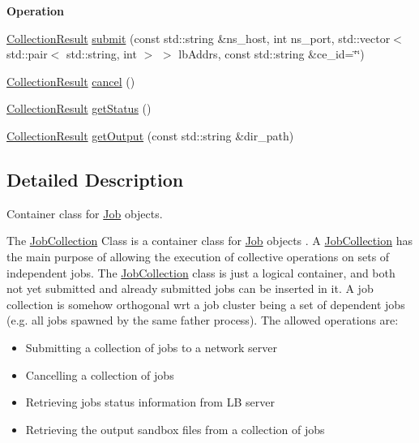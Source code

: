 \begin{Indent}{\bf Operation}\par
\begin{CompactItemize}
\item 
\hyperlink{structglite_1_1wmsui_1_1api_1_1CollectionResult}{Collection\-Result} \hyperlink{classglite_1_1wmsui_1_1api_1_1JobCollection_z7_0}{submit} (const std::string \&ns\_\-host, int ns\_\-port, std::vector$<$ std::pair$<$ std::string, int $>$ $>$ lb\-Addrs, const std::string \&ce\_\-id=\char`\"{}\char`\"{})
\item 
\hyperlink{structglite_1_1wmsui_1_1api_1_1CollectionResult}{Collection\-Result} \hyperlink{classglite_1_1wmsui_1_1api_1_1JobCollection_z7_1}{cancel} ()
\item 
\hyperlink{structglite_1_1wmsui_1_1api_1_1CollectionResult}{Collection\-Result} \hyperlink{classglite_1_1wmsui_1_1api_1_1JobCollection_z7_2}{get\-Status} ()
\item 
\hyperlink{structglite_1_1wmsui_1_1api_1_1CollectionResult}{Collection\-Result} \hyperlink{classglite_1_1wmsui_1_1api_1_1JobCollection_z7_3}{get\-Output} (const std::string \&dir\_\-path)
\end{CompactItemize}
\end{Indent}


\subsection{Detailed Description}
Container class for \hyperlink{classglite_1_1wmsui_1_1api_1_1Job}{Job} objects. 

The \hyperlink{classglite_1_1wmsui_1_1api_1_1JobCollection}{Job\-Collection} Class is a container class for \hyperlink{classglite_1_1wmsui_1_1api_1_1Job}{Job} objects . A \hyperlink{classglite_1_1wmsui_1_1api_1_1JobCollection}{Job\-Collection} has the main purpose of allowing the execution of collective operations on sets of independent jobs. The \hyperlink{classglite_1_1wmsui_1_1api_1_1JobCollection}{Job\-Collection} class is just a logical container, and both not yet submitted and already submitted jobs can be inserted in it. A job collection is somehow orthogonal wrt a job cluster being a set of dependent jobs (e.g. all jobs spawned by the same father process). The allowed operations are: \begin{itemize}
\item Submitting a collection of jobs to a network server \item Cancelling a collection of jobs \item Retrieving jobs status information from LB server \item Retrieving the output sandbox files from a collection of jobs \end{itemize}


